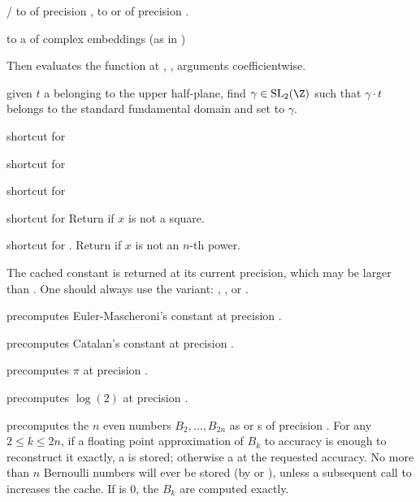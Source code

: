 \item {}/ to  of precision ,  to
 or  of precision .

\item {} to a  of complex embeddings (as in )

Then evaluates the function at , ,  arguments
coefficientwise.


 given $t$ a  belonging to the
upper half-plane, find $\gamma \in \text{SL}_2(\Z)$ such that $\gamma \cdot t$
belongs to the standard fundamental domain and set  to $\gamma$.


 shortcut for 

 shortcut for 

 shortcut for 

 shortcut for 
Return  if $x$ is not a square.

 shortcut for . Return  if $x$ is not an $n$-th power.


The cached constant is returned at its current precision, which may be larger
than . One should always use the  variant:
, , or .

 precomputes Euler-Mascheroni's constant
at precision .

 precomputes Catalan's constant at precision
.

 precomputes $\pi$ at precision .

 precomputes $\log(2)$ at precision
.

 precomputes the $n$ even
 numbers $B_2,\dots,B_{2n}$ as  or s of
precision . For any $2 \leq k \leq 2n$, if a floating point
approximation of $B_k$ to accuracy  is enough to reconstruct it
exactly, a  is stored; otherwise a  at the requested
accuracy. No more than $n$ Bernoulli numbers will ever be stored (by
 or ), unless a subsequent call to 
increases the cache. If  is $0$, the $B_k$ are computed exactly.

